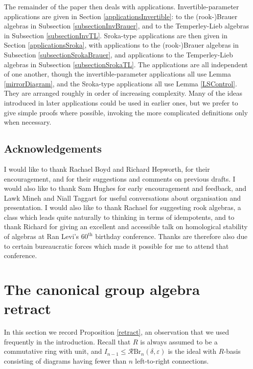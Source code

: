 \documentclass[12pt]{amsart}
\theoremstyle{plain}
\theoremstyle{definition} \newtheorem{definition}[theorem]{Definition}
\theoremstyle{plain}
\theoremstyle{plain} \newtheorem{proposition}[theorem]{Proposition}
\theoremstyle{plain} \newtheorem{conjecture}[theorem]{Conjecture}
\theoremstyle{plain} \newtheorem{corollary}[theorem]{Corollary}
\theoremstyle{remark} \newtheorem{claim}[theorem]{Claim}
\theoremstyle{remark} \newtheorem{remark}[theorem]{Remark}
\theoremstyle{remark} \newtheorem{example}[theorem]{Example}
\theoremstyle{remark} \newtheorem{comment}[theorem]{Comment}
\theoremstyle{definition} \newtheorem{question}[theorem]{Question}
\newcommand{\rook}{\mathcal{R}}
\newcommand{\Brauer}{\mathrm{Br}}
\begin{document}
The remainder of the paper then deals with applications. Invertible-parameter applications are given in Section \ref{applicationsInvertible}: to the (rook-)Brauer algebras in Subsection \ref{subsectionInvBrauer}, and to the Temperley-Lieb algebras in Subsection \ref{subsectionInvTL}. Sroka-type applications are then given in Section \ref{applicationsSroka}, with applications to the (rook-)Brauer algebras in Subsection \ref{subsectionSrokaBrauer}, and applications to the Temperley-Lieb algebras in Subsection \ref{subsectionSrokaTL}. The applications are all independent of one another, though the invertible-parameter applications all use Lemma \ref{mirrorDiagram}, and the Sroka-type applications all use Lemma \ref{LSControl}. They are arranged roughly in order of increasing complexity. Many of the ideas introduced in later applications could be used in earlier ones, but we prefer to give simple proofs where possible, invoking the more complicated definitions only when necessary.

\subsection{Acknowledgements} I would like to thank Rachael Boyd and Richard Hepworth, for their encouragement, and for their suggestions and comments on previous drafts. I would also like to thank Sam Hughes for early encouragement and feedback, and Lawk Mineh and Niall Taggart for useful conversations about organisation and presentation. I would also like to thank Rachael for suggesting rook algebras, a class which leads quite naturally to thinking in terms of idempotents, and to thank Richard for giving an excellent and accessible talk on homological stability of algebras at Ran Levi's $60^{\textrm{th}}$ birthday conference. Thanks are therefore also due to certain bureaucratic forces which made it possible for me to attend that conference.

\section{The canonical group algebra retract} \label{sectionRetract}

In this section we record Proposition \ref{retract}, an observation that we used frequently in the introduction. Recall that $R$ is always assumed to be a commutative ring with unit, and $I_{n-1} \leq \rook \Brauer_n(\delta, \varepsilon)$ is the ideal with $R$-basis consisting of diagrams having fewer than $n$ left-to-right connections.
\end{document}
